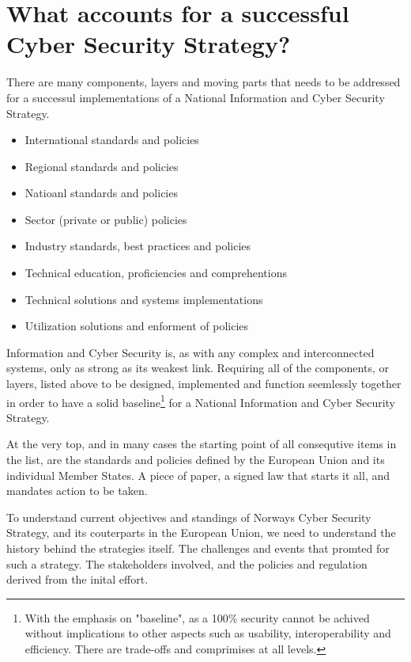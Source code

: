 
\section{What accounts for a successful Cyber Security Strategy?}

There are many components, layers and moving parts that needs to be addressed for a successul implementations of a National Information and Cyber Security Strategy.

\begin{itemize}
    \item International standards and policies
    \item Regional standards and policies
    \item Natioanl standards and policies
    \item Sector (private or public) policies
    \item Industry standards, best practices and policies
    \item Technical education, proficiencies and comprehentions
    \item Technical solutions and systems implementations
    \item Utilization solutions and enforment of policies
\end{itemize}

Information and Cyber Security is, as with any complex and interconnected systems, only as strong as its weakest link. Requiring all of the components, or layers, listed above to be designed, implemented and function seemlessly together in order to have a solid baseline\footnote[1]{With the emphasis on "baseline", as a 100\% security cannot be achived without implications to other aspects such as usability, interoperability and efficiency. There are trade-offs and comprimises at all levels.} for a National Information and Cyber Security Strategy.

At the very top, and in many cases the starting point of all consequtive items in the list, are the standards and policies defined by the European Union and its individual Member States. A piece of paper, a signed law that starts it all, and mandates action to be taken.

To understand current objectives and standings of Norways Cyber Security Strategy, and its couterparts in the European Union, we need to understand the history behind the strategies itself. The challenges and events that promted for such a strategy. The stakeholders involved, and the policies and regulation derived from the inital effort.

